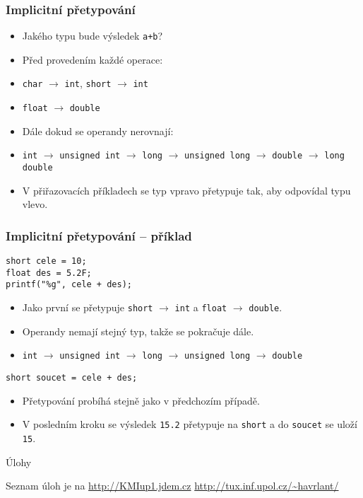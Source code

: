 \documentclass{beamer}
\begin{document}
\begin{frame}[t,fragile]\frametitle{Implicitní přetypování} 
  \begin{itemize}
    \begin{verbatim} 
int a = 10;
char b = 20;    
    \end{verbatim}
    \item Jakého typu bude výsledek \texttt{a+b}?
    \item Před provedením každé operace:
    \item \texttt{char} $\rightarrow$ \texttt{int}, \texttt{short} $\rightarrow$ \texttt{int}
    \item \texttt{float} $\rightarrow$ \texttt{double}
    \item Dále dokud se operandy nerovnají:
    \item \texttt{int} $\rightarrow$ \texttt{unsigned int} $\rightarrow$ \texttt{long} $\rightarrow$ \texttt{unsigned long} $\rightarrow$ \texttt{double} $\rightarrow$ \texttt{long double}
    \item V přiřazovacích příkladech se typ vpravo přetypuje tak, aby odpovídal typu vlevo.
  \end{itemize}
\end{frame}


\begin{frame}[t,fragile]\frametitle{Implicitní přetypování -- příklad} 
\begin{verbatim} 
short cele = 10;
float des = 5.2F;
printf("%g", cele + des);
\end{verbatim}

\begin{itemize}
  \item Jako první se přetypuje \texttt{short} $\rightarrow$ \texttt{int} a \texttt{float} $\rightarrow$ \texttt{double}.
  \item Operandy nemají stejný typ, takže se pokračuje dále.
  \item \texttt{int} $\rightarrow$ \texttt{unsigned int} $\rightarrow$ \texttt{long} $\rightarrow$ \texttt{unsigned long} $\rightarrow$ \texttt{double}
\end{itemize}

\begin{verbatim} 
short soucet = cele + des;
\end{verbatim}

\begin{itemize}
  \item Přetypování probíhá stejně jako v předchozím případě.
  \item V posledním kroku se výsledek \texttt{15.2} přetypuje na \texttt{short} a do \texttt{soucet} se uloží \texttt{15}.
\end{itemize}
\end{frame}


\begin{frame}[t,fragile]{Úlohy}
\begin{center}
\vskip 1cm
{\Large Seznam úloh je na \url{http://KMIup1.jdem.cz}}
\vskip 2cm
\url{http://tux.inf.upol.cz/~havrlant/}
\end{center}
\end{frame}
\end{document}

